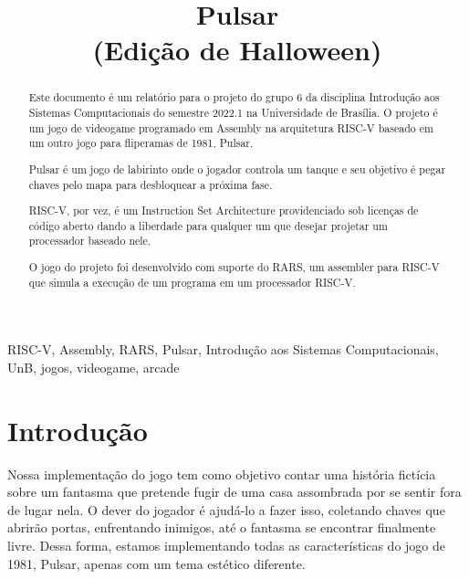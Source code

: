 \documentclass[conference]{IEEEtran}
\begin{document}
\title{Pulsar\\
(Edição de Halloween)}

\author{
\and
{}
\and
{}
}

\maketitle

\begin{abstract}
Este documento é um relatório para o projeto do grupo 6 da disciplina Introdução aos Sistemas Computacionais do semestre 2022.1 na Universidade de Brasília. O projeto é um jogo de videogame programado em Assembly na arquitetura RISC-V baseado em um outro jogo para fliperamas de 1981, Pulsar. 

Pulsar é um jogo de labirinto onde o jogador controla um tanque e seu objetivo é pegar chaves pelo mapa para desbloquear a próxima fase.\textsuperscript{\cite{b1}}

RISC-V, por vez, é um Instruction Set Architecture providenciado sob licenças de código aberto dando a liberdade para qualquer um que desejar projetar um processador baseado nele.
\textsuperscript{\cite{b2}}

O jogo do projeto foi desenvolvido com suporte do RARS, um assembler para RISC-V que simula a execução de um programa em um processador RISC-V.
\end{abstract}

\begin{IEEEkeywords}
RISC-V, Assembly, RARS, Pulsar, Introdução aos Sistemas Computacionais, UnB, jogos, videogame, arcade
\end{IEEEkeywords}

\section{Introdução}
Nossa implementação do jogo tem como objetivo contar uma história fictícia sobre um fantasma que pretende fugir de uma casa assombrada por se sentir fora de lugar nela. O dever do jogador é ajudá-lo a fazer isso, coletando chaves que abrirão portas, enfrentando inimigos, até o fantasma se encontrar finalmente livre. Dessa forma, estamos implementando todas as características do jogo de 1981, Pulsar, apenas com um tema estético diferente. 
\end{document}
